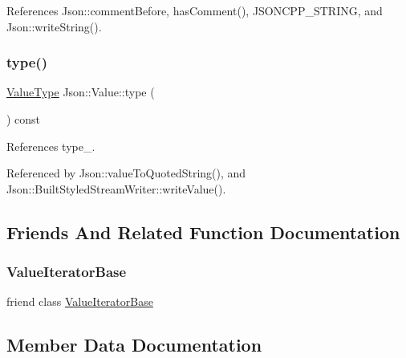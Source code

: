 References Json\+::comment\+Before, has\+Comment(), J\+S\+O\+N\+C\+P\+P\+\_\+\+S\+T\+R\+I\+NG, and Json\+::write\+String().

\mbox{\label{classJson_1_1Value_a8ce61157a011894f0252ceed232312de_a8ce61157a011894f0252ceed232312de}} 
\subsubsection{\texorpdfstring{type()}{type()}}
{\footnotesize\ttfamily \hyperlink{namespaceJson_a7d654b75c16a57007925868e38212b4e_a7d654b75c16a57007925868e38212b4e}{Value\+Type} Json\+::\+Value\+::type (\begin{DoxyParamCaption}{ }\end{DoxyParamCaption}) const}



References type\+\_\+.



Referenced by Json\+::value\+To\+Quoted\+String(), and Json\+::\+Built\+Styled\+Stream\+Writer\+::write\+Value().



\subsection{Friends And Related Function Documentation}
\mbox{\label{classJson_1_1Value_ad016df56489e5d360735457afba2f649_ad016df56489e5d360735457afba2f649}} 
\subsubsection{\texorpdfstring{Value\+Iterator\+Base}{ValueIteratorBase}}
{\footnotesize\ttfamily friend class \hyperlink{classJson_1_1ValueIteratorBase}{Value\+Iterator\+Base}\hspace{0.3cm}{\ttfamily [friend]}}



\subsection{Member Data Documentation}
\mbox{\label{classJson_1_1Value_ae0126c80dc4907aad94088553fc7632b_ae0126c80dc4907aad94088553fc7632b}} 
